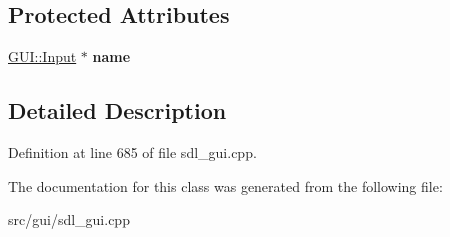 \subsection*{Protected Attributes}
\begin{DoxyCompactItemize}
\item 
\hypertarget{classSetVsyncrate_a7c739c3ee8c8f232c6f753c531f88c59}{\hyperlink{classGUI_1_1Input}{G\-U\-I\-::\-Input} $\ast$ {\bfseries name}}\label{classSetVsyncrate_a7c739c3ee8c8f232c6f753c531f88c59}

\end{DoxyCompactItemize}


\subsection{Detailed Description}


Definition at line 685 of file sdl\-\_\-gui.\-cpp.



The documentation for this class was generated from the following file\-:\begin{DoxyCompactItemize}
\item 
src/gui/sdl\-\_\-gui.\-cpp\end{DoxyCompactItemize}
